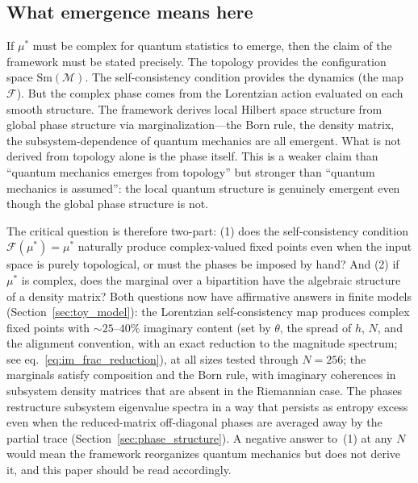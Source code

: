 \documentclass[12pt,a4paper]{article}
\theoremstyle{definition}
\theoremstyle{remark}
\begin{document}
\subsection{What emergence means here}
\label{sec:emergence_meaning}

If $\mu^*$ must be complex for quantum statistics to emerge, then the
claim of the framework must be stated precisely. The topology provides
the configuration space $\mathrm{Sm}(\mathcal{M})$. The self-consistency
condition provides the dynamics (the map $\mathcal{F}$). But the complex
phase comes from the Lorentzian action evaluated on each smooth
structure. The framework derives local Hilbert space structure from
global phase structure via marginalization---the Born rule, the density
matrix, the subsystem-dependence of quantum mechanics are all emergent.
What is not derived from topology alone is the phase itself. This is a
weaker claim than ``quantum mechanics emerges from topology'' but
stronger than ``quantum mechanics is assumed'': the local quantum
structure is genuinely emergent even though the global phase structure is
not.

The critical question is therefore two-part: (1) does the
self-consistency condition $\mathcal{F}(\mu^*) = \mu^*$ naturally
produce complex-valued fixed points even when the input space is purely
topological, or must the phases be imposed by hand? And (2) if $\mu^*$
is complex, does the marginal over a bipartition have the algebraic
structure of a density matrix? Both questions now have affirmative
answers in finite models (Section~\ref{sec:toy_model}): the Lorentzian
self-consistency map produces complex fixed points with $\sim 25$--$40\%$
imaginary content (set by $\theta$, the spread of $h$, $N$, and the
alignment convention, with an exact reduction to the magnitude
spectrum; see eq.~\eqref{eq:im_frac_reduction}), at all sizes tested
through $N = 256$; the marginals satisfy
composition and the Born rule, with imaginary coherences in subsystem
density matrices that are absent in the Riemannian case. The phases
restructure subsystem eigenvalue spectra in a way that persists as
entropy excess even when the reduced-matrix off-diagonal phases are
averaged away by the partial trace
(Section~\ref{sec:phase_structure}). A negative answer to~(1) at any $N$
would mean the framework reorganizes quantum mechanics but does not
derive it, and this paper should be read accordingly.
\end{document}
